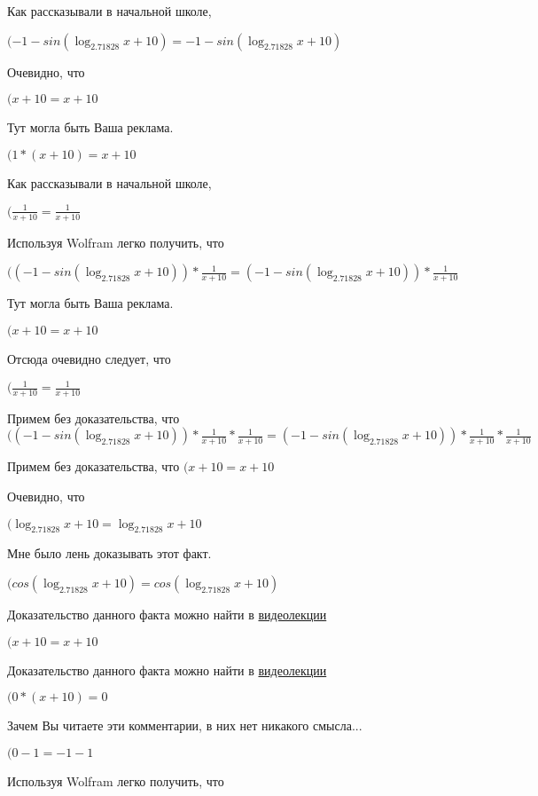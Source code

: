 \documentclass[12pt,a4paper,fleqn]{article}
\theoremstyle{definition}
\begin{document}
Как рассказывали в начальной школе,

$( -1  - sin(\log_{ 2.71828 }{ x  +  10 }) =  -1  - sin(\log_{ 2.71828 }{ x  +  10 })$

Очевидно, что

$( x  +  10  =  x  +  10 $

Тут могла быть Ваша реклама.

$( 1  * ( x  +  10 ) =  x  +  10 $

Как рассказывали в начальной школе,

$(\frac{ 1 }{ x  +  10 }
 = \frac{ 1 }{ x  +  10 }
$

Используя Wolfram легко получить, что

$(( -1  - sin(\log_{ 2.71828 }{ x  +  10 })) * \frac{ 1 }{ x  +  10 }
 = ( -1  - sin(\log_{ 2.71828 }{ x  +  10 })) * \frac{ 1 }{ x  +  10 }
$

Тут могла быть Ваша реклама.

$( x  +  10  =  x  +  10 $

Отсюда очевидно следует, что

$(\frac{ 1 }{ x  +  10 }
 = \frac{ 1 }{ x  +  10 }
$

Примем без доказательства, что
$(( -1  - sin(\log_{ 2.71828 }{ x  +  10 })) * \frac{ 1 }{ x  +  10 }
 * \frac{ 1 }{ x  +  10 }
 = ( -1  - sin(\log_{ 2.71828 }{ x  +  10 })) * \frac{ 1 }{ x  +  10 }
 * \frac{ 1 }{ x  +  10 }
$

Примем без доказательства, что
$( x  +  10  =  x  +  10 $

Очевидно, что

$(\log_{ 2.71828 }{ x  +  10 } = \log_{ 2.71828 }{ x  +  10 }$

Мне было лень доказывать этот факт.

$(cos(\log_{ 2.71828 }{ x  +  10 }) = cos(\log_{ 2.71828 }{ x  +  10 })$

Доказательство данного факта можно найти в \href{https://www.youtube.com/watch?v=dQw4w9WgXcQ}{видеолекции}

$( x  +  10  =  x  +  10 $

Доказательство данного факта можно найти в \href{https://www.youtube.com/watch?v=dQw4w9WgXcQ}{видеолекции}

$( 0  * ( x  +  10 ) =  0 $

Зачем Вы читаете эти комментарии, в них нет никакого смысла...

$( 0  -  1  =  -1  -  1 $

Используя Wolfram легко получить, что
\end{document}
